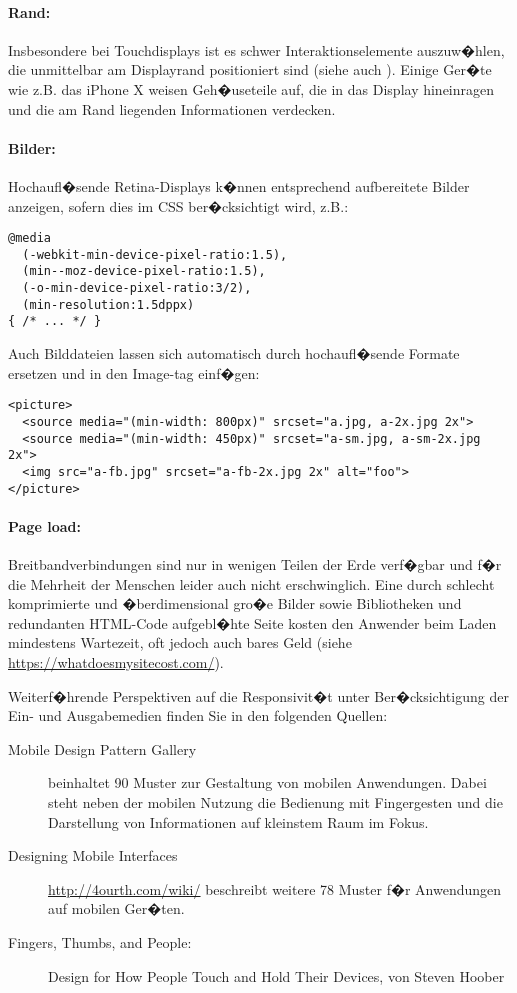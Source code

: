 \paragraph{Rand:} Insbesondere bei Touchdisplays ist es schwer Interaktionselemente auszuw�hlen, die unmittelbar am Displayrand positioniert sind (siehe auch ). Einige Ger�te wie z.B. das iPhone X weisen Geh�useteile auf, die in das Display hineinragen und die am Rand liegenden Informationen verdecken. 

\paragraph{Bilder:} Hochaufl�sende Retina-Displays k�nnen entsprechend aufbereitete Bilder anzeigen, sofern dies im CSS ber�cksichtigt wird, z.B.:
\begin{lstlisting}[basicstyle=\footnotesize]
@media
  (-webkit-min-device-pixel-ratio:1.5),
  (min--moz-device-pixel-ratio:1.5),
  (-o-min-device-pixel-ratio:3/2),
  (min-resolution:1.5dppx) 
{ /* ... */ }
\end{lstlisting}
Auch Bilddateien lassen sich automatisch durch hochaufl�sende Formate ersetzen und in den Image-tag einf�gen:
\begin{lstlisting}[basicstyle=\footnotesize]
<picture>
  <source media="(min-width: 800px)" srcset="a.jpg, a-2x.jpg 2x">
  <source media="(min-width: 450px)" srcset="a-sm.jpg, a-sm-2x.jpg 2x">
  <img src="a-fb.jpg" srcset="a-fb-2x.jpg 2x" alt="foo">
</picture>
\end{lstlisting}

\paragraph{Page load:}\label{pageload} Breitbandverbindungen sind nur in wenigen Teilen der Erde verf�gbar und f�r die Mehrheit der Menschen leider auch nicht erschwinglich. Eine durch schlecht komprimierte und �berdimensional gro�e Bilder sowie Bibliotheken  und redundanten HTML-Code aufgebl�hte Seite kosten den Anwender beim Laden mindestens Wartezeit, oft jedoch auch bares Geld (siehe \url{https://whatdoesmysitecost.com/}). 


Weiterf�hrende Perspektiven auf die Responsivit�t unter Ber�cksichtigung der Ein- und Ausgabemedien finden Sie in den folgenden Quellen: 
\begin{description}
\item[Mobile Design Pattern Gallery] \citep{neil2014mobile}  beinhaltet 90 Muster zur Gestaltung von mobilen Anwendungen. Dabei steht neben der mobilen Nutzung die Bedienung mit Fingergesten und die Darstellung von Informationen auf kleinstem Raum im Fokus.

\item[Designing Mobile Interfaces] \citep{hoober2011designing}  \link \url{http://4ourth.com/wiki/} beschreibt weitere 78 Muster f�r Anwendungen auf mobilen Ger�ten. 

\item[Fingers, Thumbs, and People:] Design for How People Touch and Hold Their Devices, von Steven Hoober 
\end{description}


